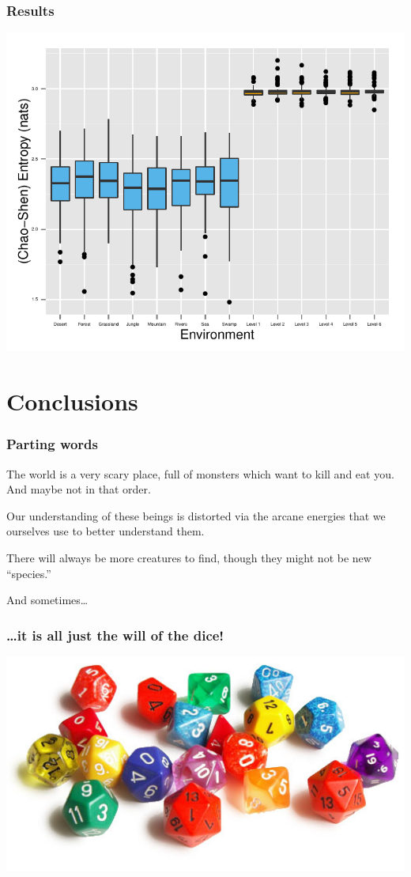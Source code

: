 \documentclass{beamer}\usepackage{graphicx, color}
\makeatletter
\def\maxwidth{ %
  \ifdim\Gin@nat@width>\linewidth
    \linewidth
  \else
    \Gin@nat@width
  \fi
}
\newenvironment{knitrout}{}{} %
\makeatother
\begin{document}
\begin{frame}
  \frametitle{Results}
\begin{knitrout}\scriptsize
{}\color{fgcolor}\includegraphics[width=\maxwidth]{figure/dungeon-eco} 
\end{knitrout}


\end{frame}


\section{Conclusions}

\begin{frame}
  \frametitle{Parting words}
  
  The world is a very scary place, full of monsters which want to kill and eat you. And maybe not in that order.

  Our understanding of these beings is distorted via the arcane energies that we ourselves use to better understand them.

  There will always be more creatures to find, though they might not be new ``species.''

  And sometimes\dots

\end{frame}

\begin{frame}
  \frametitle{\dots it is all just the will of the dice!}
  \includegraphics[width = \textwidth, keepaspectratio = true]{dice1}

\end{frame}
\end{document}
